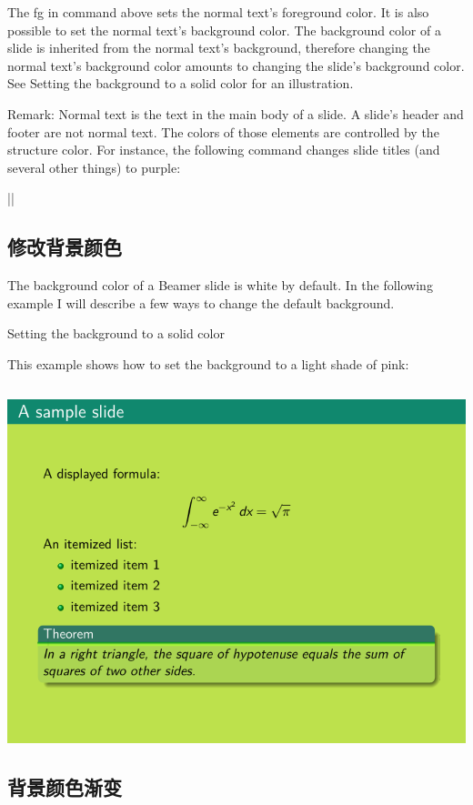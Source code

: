 \begin{column}{0.5\textwidth}
The fg in command above sets the normal text’s foreground color. It is also possible to set the normal text’s background color. The background color of a slide is inherited from the normal text’s background, therefore changing the normal text’s background color amounts to changing the slide’s background color. See  Setting the background to a solid color for an illustration.

Remark: Normal text is the text in the main body of a slide. A slide’s header and footer are not normal text. The colors of those elements are controlled by the structure color. For instance, the following command changes slide titles (and several other things) to purple:

|| 

\subsection{修改背景颜色}

The background color of a Beamer slide is white by default. In the following example I will describe a few ways to change the default background.


Setting the background to a solid color

This example shows how to set the background to a light shade of pink:

\inputminted[linenos=true]{latex}{examples/beamer/beamertheme08.tex}

\includegraphics{examples/beamer/beamertheme08.pdf}

\subsection{背景颜色渐变}


\end{column}
